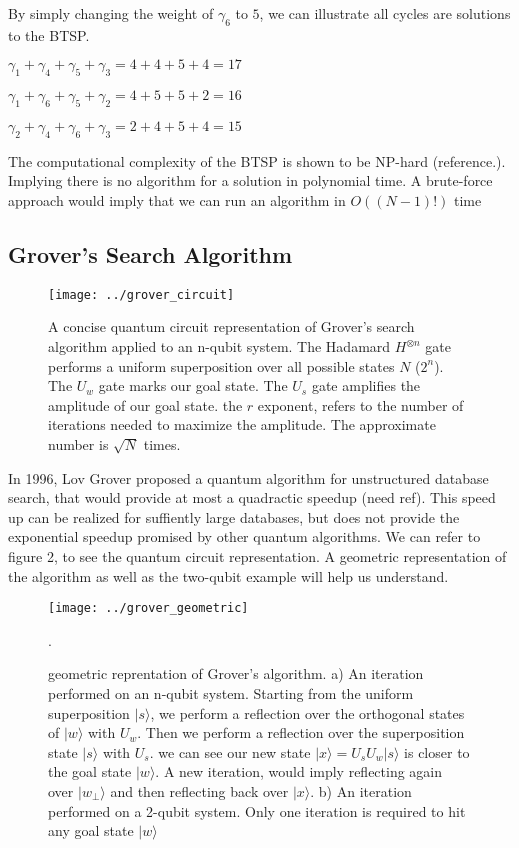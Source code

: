 \documentclass[twocolumn,showpacs,preprintnumbers,amsmath,amssymb]{revtex4}
\begin{document}
		By simply changing the weight of $\gamma_6$ to $5$, we can illustrate all cycles are solutions to the BTSP. 
		
		\begin{center}

			$\gamma_1 + \gamma_4 + \gamma_5 + \gamma_3 = 4 + 4 + 5 + 4 = 17$
			
			$ \gamma_1 + \gamma_6 + \gamma_5 + \gamma_2 = 4 + 5 + 5 + 2 = 16$
			
			$  \gamma_2 + \gamma_4 + \gamma_6 + \gamma_3 = 2 + 4 + 5 + 4 = 15$
		\end{center}
		
		The computational complexity of the BTSP is shown to be NP-hard (reference.). Implying there is no algorithm for a solution in polynomial time. A brute-force approach would imply that we can run an algorithm in $O((N-1)!)$ time
		
		\subsection{Grover's Search Algorithm}
		
		\begin{figure}[!h]
			\centering
			\texttt{[image: ../grover\_circuit]}
			\caption{A concise quantum circuit representation of Grover's search algorithm applied to an n-qubit system. The Hadamard $H^{\otimes n }$ gate performs a uniform superposition over all possible states $N$ ($2^n$). The $U_w$ gate marks our goal state. The $U_s$ gate amplifies the amplitude of our goal state. the $r$ exponent, refers to the number of iterations needed to maximize the amplitude. The approximate number is $\sqrt{N}$ times.}
			\label{fig:grovercircuit}
		\end{figure}
		
		In 1996, Lov Grover proposed a quantum algorithm for unstructured database search, that would provide at most a quadractic speedup (need ref). This speed up can be realized for suffiently large databases, but does not provide the exponential speedup promised by other quantum algorithms. We can refer to figure 2, to see the quantum circuit representation.
		A geometric representation of the algorithm as well as the two-qubit example will help us understand. 
		
		
		\begin{figure}[!h]
			\centering
			\texttt{[image: ../grover\_geometric]}
			\caption{geometric reprentation of Grover's algorithm.  a) An iteration performed on an n-qubit system.  Starting from the uniform superposition $|s\rangle$, we perform a reflection over the orthogonal states of $|w\rangle$ with $U_w$. Then we perform a reflection over the superposition state $|s\rangle$ with $U_s$. we can see our new state $|x\rangle = U_sU_w|s\rangle$ is closer to the goal state $|w\rangle$. A new iteration, would imply reflecting again over $|w_\perp\rangle$ and then reflecting back over $|x\rangle$. b) An iteration performed on a 2-qubit system. Only one iteration is required to hit any goal state $|w\rangle$ }
			\label{fig:grovergeometric}. 
		\end{figure}
		
\end{document}
